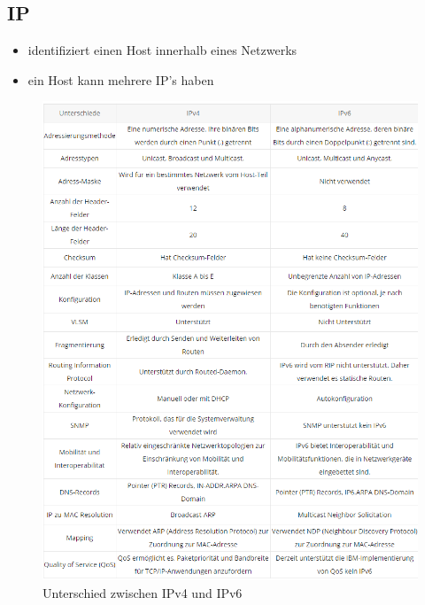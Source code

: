 \documentclass[12pt,a4paper]{article}
\begin{document}
\subsection{IP}
\begin{itemize}
\item identifiziert einen Host innerhalb eines Netzwerks
\item ein Host kann mehrere IP's haben
\end{itemize}

\begin{figure}[H]
\includegraphics[scale=0.6]{./resources/v4v6.png}
\caption{Unterschied zwischen IPv4 und IPv6}
\end{figure}
\end{document}
